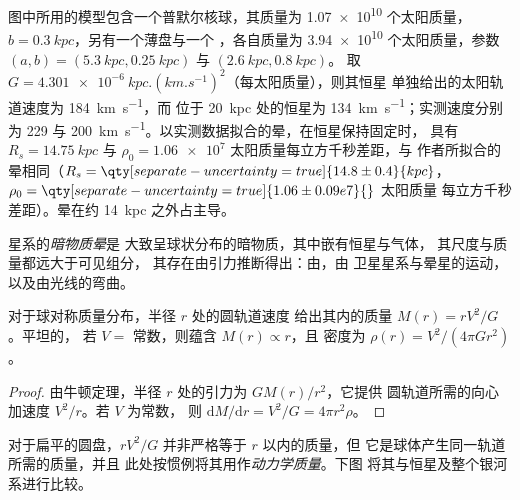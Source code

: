 图中所用的模型包含一个普默尔核球，其质量为
\num{1.07e10} 个太阳质量，$b = \qty{0.3}{kpc}$，另有一个薄盘与一个
，各自质量为 \num{3.94e10} 个太阳质量，参数 $(a, b) =
(\qty{5.3}{kpc}, \qty{0.25}{kpc})$ 与 $(\qty{2.6}{kpc}, \qty{0.8}{kpc})$。
取 $G = \qty{4.301e-6}{kpc.(km.s^{-1})^2}$（每太阳质量），则其恒星
单独给出的太阳轨道速度为 \qty{184}{km.s^{-1}}，而
位于 \qty{20}{kpc} 处的恒星为 \qty{134}{km.s^{-1}}；实测速度分别为
229 与 \qty{200}{km.s^{-1}}。以实测数据拟合的晕，在恒星保持固定时，
具有 $R_s = \qty{14.75}{kpc}$ 与
$\rho_0 = \num{1.06e7}$ 太阳质量每立方千秒差距，与
作者所拟合的晕相同（$R_s = \qty[separate-uncertainty=true]{14.8 \pm 0.4}{kpc}$，
$\rho_0 = \qty[separate-uncertainty=true]{1.06 \pm 0.09 e7}{}$ 太阳质量
每立方千秒差距）。晕在约 \qty{14}{kpc} 之外占主导。

\begin{definition}[暗物质晕]\label{def:b3:milky-way-galaxies:halo}
星系的\emph{暗物质晕}是
大致呈球状分布的暗物质，其中嵌有恒星与气体，
其尺度与质量都远大于可见组分，
其存在由引力推断得出：由，由
卫星星系与晕星的运动，以及由光线的弯曲。
\end{definition}

\begin{theorem}[半径以内的质量]\label{thm:b3:milky-way-galaxies:enclosed}
对于球对称质量分布，半径 $r$ 处的圆轨道速度
给出其内的质量 $M(r) = rV^2/G$。平坦的，
若 $V = $ 常数，则蕴含 $M(r) \propto r$，且
密度为 $\rho(r) = V^2/(4\pi G r^2)$。
\end{theorem}

\begin{proof}
由牛顿定理，半径 $r$ 处的引力为 $GM(r)/r^2$，它提供
圆轨道所需的向心加速度 $V^2/r$。若 $V$ 为常数，
则 $\mathrm{d}M/\mathrm{d}r = V^2/G = 4\pi r^2\rho$。
\end{proof}

对于扁平的圆盘，$rV^2/G$ 并非严格等于 $r$ 以内的质量，但
它是球体产生同一轨道所需的质量，并且
此处按惯例将其用作\emph{动力学质量}。下图
将其与恒星及整个银河系进行比较。

